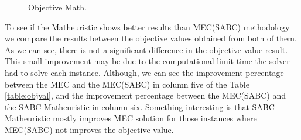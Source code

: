\begin{figure}[H]
\hspace{0.4cm}%
\vspace{0.4cm}
\caption{Objective Math.}
\label{Obj_Math}
\end{figure}


To see if the Matheuristic shows better results than MEC(SABC) methodology we compare the results between the objective values obtained from both of them. As we can see, there is not a significant difference in the objective value result. This small improvement may be due to the computational limit time the solver had to solve each instance. Although, we can see the improvement percentage between the MEC and the MEC(SABC) in column five of the Table \ref{table:objval}, and the improvement percentage between the MEC(SABC) and the SABC Matheuristic in column six. Something interesting is that SABC Matheuristic mostly improves MEC solution for those instances where MEC(SABC) not improves the objective value.


